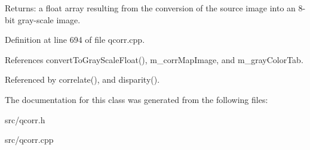 \begin{Desc}
\end{Desc}
\begin{Desc}
\item[Returns:]a float array resulting from the conversion of the source image into an 8-bit gray-scale image. \end{Desc}


Definition at line 694 of file qcorr.cpp.

References convertToGrayScaleFloat(), m\_\-corrMapImage, and m\_\-grayColorTab.

Referenced by correlate(), and disparity().

The documentation for this class was generated from the following files:\begin{CompactItemize}
\item 
src/qcorr.h\item 
src/qcorr.cpp\end{CompactItemize}
